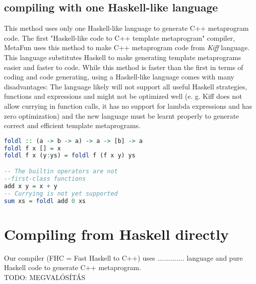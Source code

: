 \documentclass{article}
\begin{document}
\subsection{compiling with one Haskell-like language}
This method uses only one Haskell-like language to generate C++ metaprogram code. The first "Haskell-like code to C++ template metaprogram" compiler, MetaFun\cite{metafun} uses this method to make C++ metaprogram code from \textit{Kiff} language. This language substitutes Haskell to make generating template metaprograms easier and faster to code. While this method is faster than the first in terms of coding and code generating, using a Haskell-like language comes with many disadvantages: The language likely will not support all useful Haskell strategies, functions and expressions and might not be optimized well (e. g. Kiff does not allow currying in function calls, it has no support for lambda expressions and has zero optimization) and the new language must be learnt properly to generate  correct and efficient template metaprograms.
\begin{lstlisting}[language=Haskell, caption =Definition of sum using Kiff with comments of missing functions]
foldl :: (a -> b -> a) -> a -> [b] -> a
foldl f x [] = x
foldl f x (y:ys) = foldl f (f x y) ys

-- The builtin operators are not
--first-class functions
add x y = x + y
-- Currying is not yet supported 
sum xs = foldl add 0 xs   
\end{lstlisting}

\section{Compiling from Haskell directly}
Our compiler (FHC = Fast Haskell to C++) uses .............. language and pure Haskell code to generate C++ metaprogram.\\
TODO: MEGVALÓSÍTÁS \\
\end{document}

